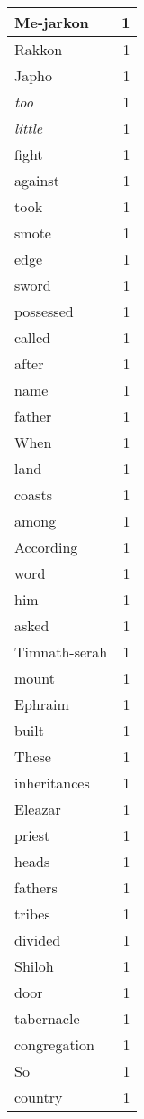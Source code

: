 \begin{center}
\begin{longtable}{l|r}
Me-jarkon & 1\\ \hline 
Rakkon & 1\\ \hline 
Japho & 1\\ \hline 
\emph{too} & 1\\ \hline 
\emph{little} & 1\\ \hline 
fight & 1\\ \hline 
against & 1\\ \hline 
took & 1\\ \hline 
smote & 1\\ \hline 
edge & 1\\ \hline 
sword & 1\\ \hline 
possessed & 1\\ \hline 
called & 1\\ \hline 
after & 1\\ \hline 
name & 1\\ \hline 
father & 1\\ \hline 
When & 1\\ \hline 
land & 1\\ \hline 
coasts & 1\\ \hline 
among & 1\\ \hline 
According & 1\\ \hline 
word & 1\\ \hline 
him & 1\\ \hline 
asked & 1\\ \hline 
Timnath-serah & 1\\ \hline 
mount & 1\\ \hline 
Ephraim & 1\\ \hline 
built & 1\\ \hline 
These & 1\\ \hline 
inheritances & 1\\ \hline 
Eleazar & 1\\ \hline 
priest & 1\\ \hline 
heads & 1\\ \hline 
fathers & 1\\ \hline 
tribes & 1\\ \hline 
divided & 1\\ \hline 
Shiloh & 1\\ \hline 
door & 1\\ \hline 
tabernacle & 1\\ \hline 
congregation & 1\\ \hline 
So & 1\\ \hline 
country & 1\\ \hline 
\end{longtable}
\end{center}



